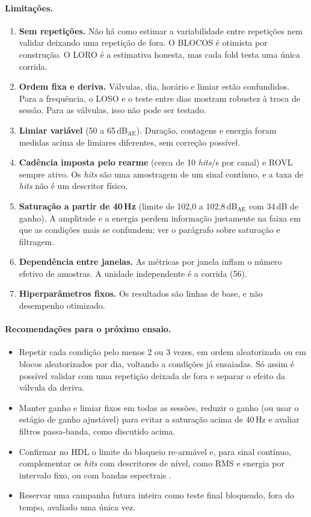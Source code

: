 \documentclass[12pt]{article}
\begin{document}
\paragraph{Limitações.}
\begin{enumerate}
	\item \textbf{Sem repetições.} Não há como estimar a variabilidade entre repetições nem validar deixando uma repetição de fora. O BLOCOS é otimista por construção. O LORO é a estimativa honesta, mas cada fold testa uma única corrida.
	\item \textbf{Ordem fixa e deriva.} Válvulas, dia, horário e limiar estão confundidos. Para a frequência, o LOSO e o teste entre dias mostram robustez à troca de sessão. Para as válvulas, isso não pode ser testado.
	\item \textbf{Limiar variável} (50 a 65\,dB\(_{\mathrm{AE}}\)). Duração, contagens e energia foram medidas acima de limiares diferentes, sem correção possível.
	\item \textbf{Cadência imposta pelo rearme} (cerca de 10 \textit{hits}/s por canal) e ROVL sempre ativo. Os \textit{hits} são uma amostragem de um sinal contínuo, e a taxa de \textit{hits} não é um descritor físico.
	\item \textbf{Saturação a partir de 40\,Hz} (limite de 102,0 a 102,8\,dB\(_{\mathrm{AE}}\) com 34\,dB de ganho). A amplitude e a energia perdem informação justamente na faixa em que as condições mais se confundem; ver o parágrafo sobre saturação e filtragem.
	\item \textbf{Dependência entre janelas.} As métricas por janela inflam o número efetivo de amostras. A unidade independente é a corrida (56).
	\item \textbf{Hiperparâmetros fixos.} Os resultados são linhas de base, e não desempenho otimizado.
\end{enumerate}

\paragraph{Recomendações para o próximo ensaio.}
\begin{itemize}
	\item Repetir cada condição pelo menos 2 ou 3 vezes, em ordem aleatorizada ou em blocos aleatorizados por dia, voltando a condições já ensaiadas. Só assim é possível validar com uma repetição deixada de fora e separar o efeito da válvula da deriva.
	\item Manter ganho e limiar fixos em todas as sessões, reduzir o ganho (ou usar o estágio de ganho ajustável) para evitar a saturação acima de 40\,Hz e avaliar filtros passa-banda, como discutido acima.
	\item Confirmar no HDL o limite do bloqueio re-armável e, para sinal contínuo, complementar os \textit{hits} com descritores de nível, como RMS e energia por intervalo fixo, ou com bandas espectrais \cite{derakhshan1991}.
	\item Reservar uma campanha futura inteira como teste final bloqueado, fora do tempo, avaliado uma única vez.
\end{itemize}
\end{document}
